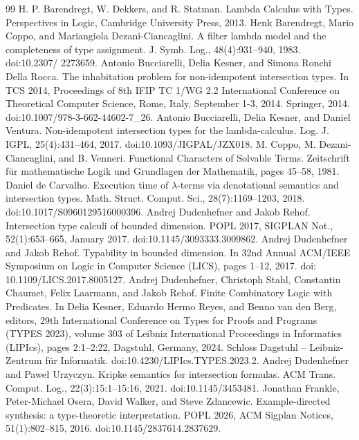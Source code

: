 \begin{thebibliography}{99}
 H. P. Barendregt, W. Dekkers, and R. Statman. Lambda Calculus with Types. Perspectives in Logic, Cambridge University Press, 2013.
 Henk Barendregt, Mario Coppo, and Mariangiola Dezani-Ciancaglini. A filter lambda model and the completeness of type assignment. J. Symb. Log., 48(4):931–940, 1983. doi:10.2307/ 2273659.
 Antonio Bucciarelli, Delia Kesner, and Simona Ronchi Della Rocca. The inhabitation problem for non-idempotent intersection types. In TCS 2014, Proceedings of 8th IFIP TC 1/WG 2.2 International Conference on Theoretical Computer Science, Rome, Italy, September 1-3, 2014. Springer, 2014. doi:10.1007/978-3-662-44602-7\_26.
 Antonio Bucciarelli, Delia Kesner, and Daniel Ventura. Non-idempotent intersection types for the lambda-calculus. Log. J. IGPL, 25(4):431–464, 2017. doi:10.1093/JIGPAL/JZX018.
 M. Coppo, M. Dezani-Ciancaglini, and B. Venneri. Functional Characters of Solvable Terms. Zeitschrift für mathematische Logik und Grundlagen der Mathematik, pages 45–58, 1981.
 Daniel de Carvalho. Execution time of \ensuremath{\lambda}-terms via denotational semantics and intersection types. Math. Struct. Comput. Sci., 28(7):1169–1203, 2018. doi:10.1017/S0960129516000396.
 Andrej Dudenhefner and Jakob Rehof. Intersection type calculi of bounded dimension. POPL 2017, SIGPLAN Not., 52(1):653–665, January 2017. doi:10.1145/3093333.3009862.
 Andrej Dudenhefner and Jakob Rehof. Typability in bounded dimension. In 32nd Annual ACM/IEEE Symposium on Logic in Computer Science (LICS), pages 1–12, 2017. doi: 10.1109/LICS.2017.8005127.
 Andrej Dudenhefner, Christoph Stahl, Constantin Chaumet, Felix Laarmann, and Jakob Rehof. Finite Combinatory Logic with Predicates. In Delia Kesner, Eduardo Hermo Reyes, and Benno van den Berg, editors, 29th International Conference on Types for Proofs and Programs (TYPES 2023), volume 303 of Leibniz International Proceedings in Informatics (LIPIcs), pages 2:1–2:22, Dagstuhl, Germany, 2024. Schloss Dagstuhl – Leibniz-Zentrum für Informatik. doi:10.4230/LIPIcs.TYPES.2023.2.
 Andrej Dudenhefner and Paweł Urzyczyn. Kripke semantics for intersection formulas. ACM Trans. Comput. Log., 22(3):15:1–15:16, 2021. doi:10.1145/3453481.
 Jonathan Frankle, Peter-Michael Osera, David Walker, and Steve Zdancewic. Example-directed synthesis: a type-theoretic interpretation. POPL 2026, ACM Sigplan Notices, 51(1):802–815, 2016. doi:10.1145/2837614.2837629.

\end{thebibliography}
